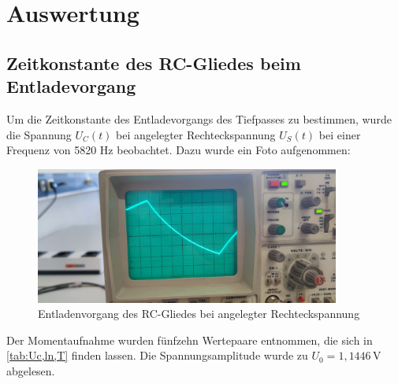\newpage

\section{Auswertung}
\label{sec:Auswertung}

\subsection{Zeitkonstante des RC-Gliedes beim Entladevorgang}

Um die Zeitkonstante des Entladevorgangs des Tiefpasses zu bestimmen, wurde die Spannung $U_C(t)$ bei angelegter 
Rechteckspannung $U_S(t)$ bei einer Frequenz von 5820 Hz beobachtet. Dazu wurde ein Foto aufgenommen:

\begin{figure}
  \centering
  \includegraphics[width=100mm,scale=0.5]{AufgabeA.jpeg}
  \caption{Entladenvorgang des RC-Gliedes bei angelegter Rechteckspannung}
  \label{fig:AufgabeA}
\end{figure}

Der Momentaufnahme wurden fünfzehn Wertepaare entnommen, die sich in \autoref{tab:Uc,ln,T} finden lassen. Die Spannungsamplitude
wurde zu $U_0 = 1{,}1446 \, \unit{\volt}$ abgelesen.

